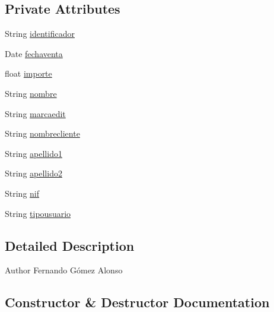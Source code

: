 \subsection*{Private Attributes}
\begin{DoxyCompactItemize}
\item 
String \mbox{\hyperlink{classlibreria_1_1_factura_a7bb7a8e9b6d2211ea69eed1db513a47b}{identificador}}
\item 
Date \mbox{\hyperlink{classlibreria_1_1_factura_aac2c75df73a6156cca7c561448d1a783}{fechaventa}}
\item 
float \mbox{\hyperlink{classlibreria_1_1_factura_ad6da76d97fe2956e230c0757d14ae664}{importe}}
\item 
String \mbox{\hyperlink{classlibreria_1_1_factura_acd12a84d167767add71cac38d219088f}{nombre}}
\item 
String \mbox{\hyperlink{classlibreria_1_1_factura_a71087e2afc07fab380ed309a19577cec}{marcaedit}}
\item 
String \mbox{\hyperlink{classlibreria_1_1_factura_a6a9dc56e42e06f7928de4c51bff30443}{nombrecliente}}
\item 
String \mbox{\hyperlink{classlibreria_1_1_factura_a83e5ee3edddf7c91a71605ea4eeb9d5f}{apellido1}}
\item 
String \mbox{\hyperlink{classlibreria_1_1_factura_af91345af6a4d1ae15efc26bd3ef29524}{apellido2}}
\item 
String \mbox{\hyperlink{classlibreria_1_1_factura_a13e68de98d752d7226ca9107446075ec}{nif}}
\item 
String \mbox{\hyperlink{classlibreria_1_1_factura_a79b1b03330788462f7659fc11e6374fc}{tipousuario}}
\end{DoxyCompactItemize}


\subsection{Detailed Description}
\begin{DoxyAuthor}{Author}
Fernando Gómez Alonso 
\end{DoxyAuthor}


\subsection{Constructor \& Destructor Documentation}
\mbox{\label{classlibreria_1_1_factura_af01d3b5e4f0d41bd2a669363921e2619}} 
